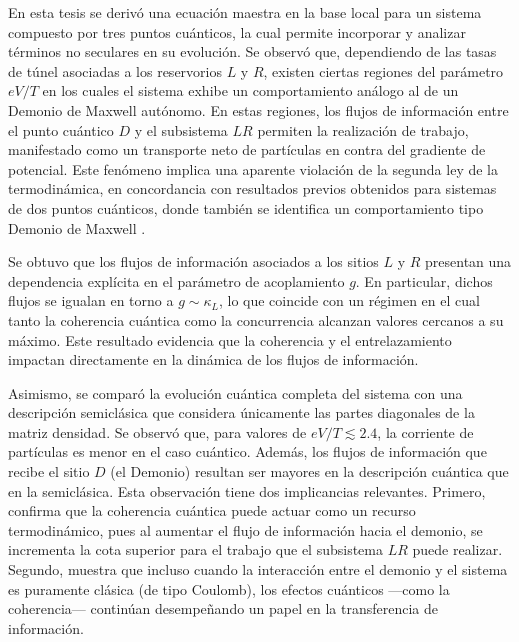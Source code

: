 En esta tesis se derivó una ecuación maestra en la base local para un sistema compuesto por tres puntos cuánticos, la cual permite incorporar y analizar términos no seculares en su evolución. Se observó que, dependiendo de las tasas de túnel asociadas a los reservorios $L$ y $R$, existen ciertas regiones del parámetro $eV/T$ en los cuales el sistema exhibe un comportamiento análogo al de un Demonio de Maxwell autónomo. En estas regiones, los flujos de información entre el punto cuántico $D$ y el subsistema $LR$ permiten la realización de trabajo, manifestado como un transporte neto de partículas en contra del gradiente de potencial. Este fenómeno implica una aparente violación de la segunda ley de la termodinámica, en concordancia con resultados previos obtenidos para sistemas de dos puntos cuánticos, donde también se identifica un comportamiento tipo Demonio de Maxwell \cite{horowitz2014thermodynamics}.

Se obtuvo que los flujos de información asociados a los sitios $L$ y $R$ presentan una dependencia explícita en el parámetro de acoplamiento $g$. En particular, dichos flujos se igualan en torno a $g \sim \kappa_L$, lo que coincide con un régimen en el cual tanto la coherencia cuántica como la concurrencia alcanzan valores cercanos a su máximo. Este resultado evidencia que la coherencia y el entrelazamiento impactan directamente en la dinámica de los flujos de información.

Asimismo, se comparó la evolución cuántica completa del sistema con una descripción semiclásica que considera únicamente las partes diagonales de la matriz densidad. Se observó que, para valores de $eV/T \lesssim 2.4$, la corriente de partículas es menor en el caso cuántico. Además, los flujos de información que recibe el sitio $D$ (el Demonio) resultan ser mayores en la descripción cuántica que en la semiclásica. Esta observación tiene dos implicancias relevantes. Primero, confirma que la coherencia cuántica puede actuar como un recurso termodinámico, pues al aumentar el flujo de información hacia el demonio, se incrementa la cota superior para el trabajo que el subsistema $LR$ puede realizar. Segundo, muestra que incluso cuando la interacción entre el demonio y el sistema es puramente clásica (de tipo Coulomb), los efectos cuánticos —como la coherencia— continúan desempeñando un papel en la transferencia de información.

